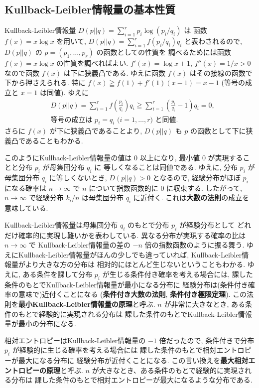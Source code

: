 \documentclass[12pt,twoside]{jarticle}
\theoremstyle{jplain}
\theoremstyle{jplain}
\theoremstyle{jplain}
\numberwithin{theorem}{section}
\numberwithin{equation}{section}
\numberwithin{figure}{section}
\numberwithin{table}{section}
\begin{document}
\subsection{Kullback-Leibler情報量の基本性質}
\label{sec:KL-prop}

Kullback-Leibler情報量 $D(p||q)=\sum_{i=1}^r p_i\log(p_i/q_i)$ は
函数 $f(x)=x\log x$ を用いて, 
$D(p||q)=\sum_{i=1}^r f(p_i/q_i)q_i$ と表わされるので, 
$D(p||q)$ の $p=(p_1,\ldots,p_r)$ の函数としての性質を
調べるためには函数 $f(x)=x\log x$ の性質を調べればよい.
$f'(x)=\log x + 1$, $f''(x)=1/x>0$ なので函数 $f(x)$ は下に狭義凸である.
ゆえに函数 $f(x)$ はその接線の函数で下から押さえられる.
特に $f(x)\geqq f(1)+f'(1)(x-1)=x-1$ (等号の成立と $x=1$ は同値).
ゆえに
\begin{align*}
&
D(p||q)
=\sum_{i=1}^r f\left(\frac{p_i}{q_i}\right)q_i
\geqq \sum_{i=1}^r\left(\frac{p_i}{q_i}-1\right)q_i
=0,
\\ &
\text{等号の成立は $p_i=q_i$ ($i=1,\ldots,r$) と同値.}
\end{align*}
さらに $f(x)$ が下に狭義凸であることより, 
$D(p||q)$ も $p$ の函数として下に狭義凸であることもわかる.

このようにKullback-Leibler情報量の値は $0$ 以上になり, 
最小値 $0$ が実現することと分布 $p_i$ が母集団分布 $q_i$ に
等しくなることは同値である.
ゆえに, 分布 $p_i$ が母集団分布 $q_i$ に等しくないとき, 
$D(p||q)>0$ となるので, 
経験分布がほぼ $p_i$ になる確率は $n\to\infty$ で
$n$ について指数函数的に $0$ に収束する.
したがって, $n\to\infty$ で経験分布 $k_i/n$ は母集団分布 $q_i$ に近付く.
これは{\bf 大数の法則}の成立を意味している.

Kullback-Leibler情報量は母集団分布 $q_i$ のもとで分布 $p_i$ が経験分布として
どれだけ確率的に実現し難いかを表わしている.
異なる分布が実現する確率の比は $n\to\infty$ で
Kullback-Leibler情報量の差の $-n$ 倍の指数函数のように振る舞う.
ゆえにKullback-Leibler情報量がほんの少しでも違っていれば, 
Kullback-Leibler情報量がより大きな方の分布は
相対的にほとんど生じないということもわかる.
ゆえに, ある条件を課して分布 $p_i$ が生じる条件付き確率を考える場合には, 
課した条件のもとでKullback-Leibler情報量が最小になる分布に
経験分布は(条件付き確率の意味で)近付くことになる
({\bf 条件付き大数の法則}, {\bf 条件付き極限定理}).
この法則を{\bf 最小Kullback-Leibler情報量の原理}と呼ぶ.
$n$ が非常に大きなとき, ある条件のもとで経験的に実現される分布は
課した条件のもとでKullback-Leibler情報量が最小の分布になる.

相対エントロピーはKullback-Leibler情報量の $-1$ 倍だったので,
条件付きで分布 $p_i$ が経験的に生じる確率を考える場合には
課した条件のもとで相対エントロピーが最大になる分布に
経験分布が近付くことになる.
この言い換えを{\bf 最大相対エントロピーの原理}と呼ぶ.
$n$ が大きなとき、ある条件のもとで経験的に実現される分布は
課した条件のもとで相対エントロピーが最大になるような分布である.
\end{document}
